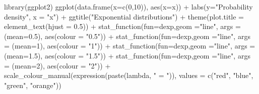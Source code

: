 \documentclass[landscape, 20pt]{extreport}
\newenvironment{Shaded}{\begin{snugshade}}{\end{snugshade}}
\newcommand{\AttributeTok}[1]{\textcolor[rgb]{0.77,0.63,0.00}{#1}}
\newcommand{\DecValTok}[1]{\textcolor[rgb]{0.00,0.00,0.81}{#1}}
\newcommand{\FloatTok}[1]{\textcolor[rgb]{0.00,0.00,0.81}{#1}}
\newcommand{\FunctionTok}[1]{\textcolor[rgb]{0.00,0.00,0.00}{#1}}
\newcommand{\NormalTok}[1]{#1}
\newcommand{\SpecialCharTok}[1]{\textcolor[rgb]{0.00,0.00,0.00}{#1}}
\newcommand{\StringTok}[1]{\textcolor[rgb]{0.31,0.60,0.02}{#1}}
\theoremstyle{definition}
\theoremstyle{definition}
\theoremstyle{definition}
\theoremstyle{definition}
\theoremstyle{remark}
\begin{document}
\begin{Shaded}
\begin{Highlighting}[]
\FunctionTok{library}\NormalTok{(ggplot2)}
\FunctionTok{ggplot}\NormalTok{(}\FunctionTok{data.frame}\NormalTok{(}\AttributeTok{x=}\FunctionTok{c}\NormalTok{(}\DecValTok{0}\NormalTok{,}\DecValTok{10}\NormalTok{)), }\FunctionTok{aes}\NormalTok{(}\AttributeTok{x=}\NormalTok{x)) }\SpecialCharTok{+} 
  \FunctionTok{labs}\NormalTok{(}\AttributeTok{y=}\StringTok{"Probability density"}\NormalTok{, }\AttributeTok{x =} \StringTok{"x"}\NormalTok{) }\SpecialCharTok{+}
  \FunctionTok{ggtitle}\NormalTok{(}\StringTok{"Exponential distributions"}\NormalTok{) }\SpecialCharTok{+}
  \FunctionTok{theme}\NormalTok{(}\AttributeTok{plot.title =} \FunctionTok{element\_text}\NormalTok{(}\AttributeTok{hjust =} \FloatTok{0.5}\NormalTok{)) }\SpecialCharTok{+}
  \FunctionTok{stat\_function}\NormalTok{(}\AttributeTok{fun=}\NormalTok{dexp,}\AttributeTok{geom =}\StringTok{"line"}\NormalTok{, }\AttributeTok{args =}\NormalTok{ (}\AttributeTok{mean=}\FloatTok{0.5}\NormalTok{), }\FunctionTok{aes}\NormalTok{(}\AttributeTok{colour =} \StringTok{"0.5"}\NormalTok{)) }\SpecialCharTok{+}
  \FunctionTok{stat\_function}\NormalTok{(}\AttributeTok{fun=}\NormalTok{dexp,}\AttributeTok{geom =}\StringTok{"line"}\NormalTok{, }\AttributeTok{args =}\NormalTok{ (}\AttributeTok{mean=}\DecValTok{1}\NormalTok{), }\FunctionTok{aes}\NormalTok{(}\AttributeTok{colour =} \StringTok{"1"}\NormalTok{)) }\SpecialCharTok{+}
  \FunctionTok{stat\_function}\NormalTok{(}\AttributeTok{fun=}\NormalTok{dexp,}\AttributeTok{geom =}\StringTok{"line"}\NormalTok{, }\AttributeTok{args =}\NormalTok{ (}\AttributeTok{mean=}\FloatTok{1.5}\NormalTok{), }\FunctionTok{aes}\NormalTok{(}\AttributeTok{colour =} \StringTok{"1.5"}\NormalTok{)) }\SpecialCharTok{+}
  \FunctionTok{stat\_function}\NormalTok{(}\AttributeTok{fun=}\NormalTok{dexp,}\AttributeTok{geom =}\StringTok{"line"}\NormalTok{, }\AttributeTok{args =}\NormalTok{ (}\AttributeTok{mean=}\DecValTok{2}\NormalTok{), }\FunctionTok{aes}\NormalTok{(}\AttributeTok{colour =} \StringTok{"2"}\NormalTok{)) }\SpecialCharTok{+} 
  \FunctionTok{scale\_colour\_manual}\NormalTok{(}\FunctionTok{expression}\NormalTok{(}\FunctionTok{paste}\NormalTok{(lambda, }\StringTok{" = "}\NormalTok{)), }\AttributeTok{values =} \FunctionTok{c}\NormalTok{(}\StringTok{"red"}\NormalTok{, }\StringTok{"blue"}\NormalTok{, }\StringTok{"green"}\NormalTok{, }\StringTok{"orange"}\NormalTok{))}
\end{Highlighting}
\end{Shaded}
\end{document}
